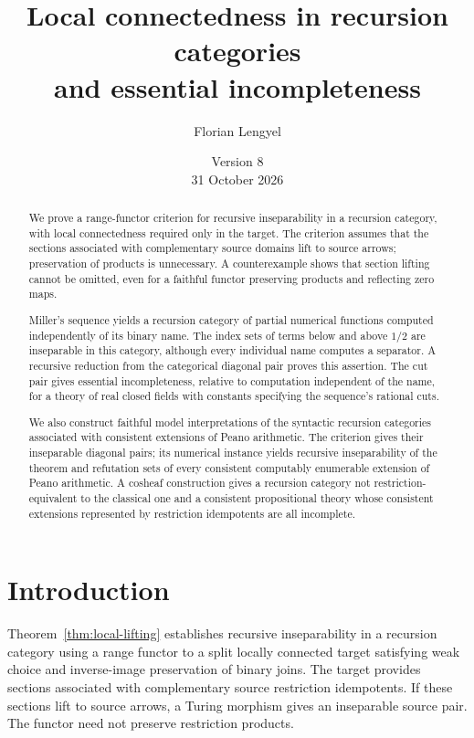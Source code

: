 \documentclass[11pt]{article}
\title{Local connectedness in recursion categories\\
and essential incompleteness}
\author{Florian Lengyel}
\date{Version 8\\31 October 2026}
\begin{document}
\maketitle

\begin{abstract}
We prove a range-functor criterion for recursive inseparability in a
recursion category, with local connectedness required only in the target.
The criterion assumes that the sections associated with complementary
source domains lift to source arrows; preservation of products is
unnecessary. A counterexample
shows that section lifting cannot be omitted, even for a faithful functor
preserving products and reflecting zero maps.

Miller's sequence yields a recursion category of partial numerical
functions computed independently of its binary name. The index sets of
terms below and above $1/2$ are inseparable in this category, although
every individual name computes a separator. A recursive reduction from
the categorical diagonal pair proves this assertion. The cut pair
gives essential incompleteness, relative to computation independent of
the name, for a theory of real closed fields with constants specifying
the sequence's rational cuts.

We also construct faithful model interpretations of the syntactic
recursion categories associated with consistent extensions of Peano
arithmetic. The criterion gives their inseparable diagonal pairs; its
numerical instance yields recursive inseparability of the theorem and
refutation sets of every consistent computably enumerable extension of
Peano arithmetic. A cosheaf construction gives a recursion category
not restriction-equivalent to the classical one and a consistent
propositional theory whose consistent
extensions represented by restriction idempotents are all incomplete.
\end{abstract}

\section{Introduction}

Theorem~\ref{thm:local-lifting} establishes recursive inseparability
in a recursion category using a range functor to a split locally
connected target satisfying weak choice and inverse-image preservation
of binary joins. The target provides sections associated with
complementary source restriction idempotents. If these sections lift
to source arrows, a Turing morphism gives an inseparable source pair.
The functor need not preserve restriction products.
\end{document}
